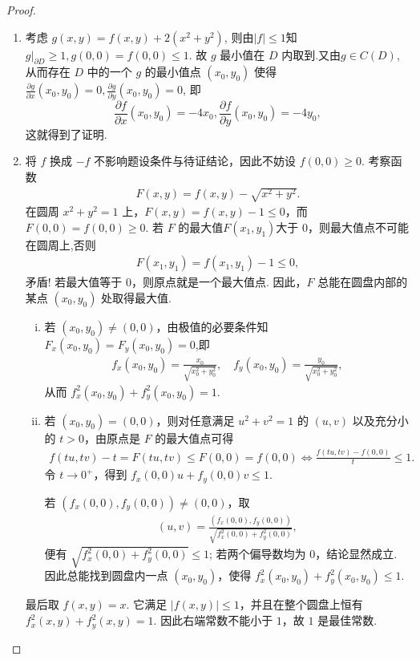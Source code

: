 \documentclass[../../main.tex]{subfiles}%
\begin{document}
\begin{proof}
\begin{enumerate}[(1)]
\item 考虑 \( g(x, y) = f(x, y) + 2(x^2 + y^2) \), 则由$|f|\leqslant 1$知\( g|_{\partial D} \geqslant 1, g(0, 0)=f(0,0) \leqslant 1 \). 故 \( g \) 最小值在 \( D \) 内取到.又由$g\in C(D)$,从而存在 \( D \) 中的一个 \( g \) 的最小值点 \( (x_0, y_0) \) 使得 \( \frac{\partial g}{\partial x}(x_0, y_0) = 0, \frac{\partial g}{\partial y}(x_0, y_0) = 0 \), 即
\[
\frac{\partial f}{\partial x}(x_0, y_0) = -4x_0, \frac{\partial f}{\partial y}(x_0, y_0) = -4y_0,
\]
这就得到了证明.

\item 将 \(f\) 换成 \(-f\) 不影响题设条件与待证结论，因此不妨设 \(f(0,0) \geqslant 0\).
考察函数
\begin{align*}
F(x,y) = f(x,y) - \sqrt{x^2+y^2}.
\end{align*}
在圆周 \(x^2+y^2=1\) 上，\(F(x,y) = f(x,y) - 1 \leqslant 0\)，而 \(F(0,0) = f(0,0) \geqslant 0\). 若 \(F\) 的最大值$F(x_1,y_1)$大于 \(0\)，则最大值点不可能在圆周上,否则
\begin{align*}
F(x_1,y_1)=f(x_1,y_1)-1\leqslant 0,
\end{align*}
矛盾!
若最大值等于 \(0\)，则原点就是一个最大值点. 因此，\(F\) 总能在圆盘内部的某点 \((x_0,y_0)\) 处取得最大值.
\begin{enumerate}[(i)]
\item 若 \((x_0,y_0) \neq (0,0)\)，由极值的必要条件知$F_x(x_0,y_0)=F_y(x_0,y_0)=0$,即
\begin{align*}
f_x(x_0,y_0) = \frac{x_0}{\sqrt{x_0^2+y_0^2}}, \quad f_y(x_0,y_0) = \frac{y_0}{\sqrt{x_0^2+y_0^2}},
\end{align*}
从而 \(f_x^2(x_0,y_0) + f_y^2(x_0,y_0) = 1\).

\item 若 \((x_0,y_0) = (0,0)\)，则对任意满足 \(u^2+v^2=1\) 的 \((u,v)\) 以及充分小的 \(t>0\)，由原点是 \(F\) 的最大值点可得
\begin{align*}
f(tu,tv)-t=F\left( tu,tv \right) \leqslant F\left( 0,0 \right) =f(0,0)\Longleftrightarrow \frac{f(tu,tv)-f(0,0)}{t}\leqslant 1.
\end{align*}
令 \(t \to 0^+\)，得到 \(f_x(0,0)u + f_y(0,0)v \leqslant 1\).

若 \((f_x(0,0), f_y(0,0)) \neq (0,0)\)，取
\begin{align*}
(u,v) = \frac{(f_x(0,0), f_y(0,0))}{\sqrt{f_x^2(0,0)+f_y^2(0,0)}},
\end{align*}
便有 \(\sqrt{f_x^2(0,0)+f_y^2(0,0)} \leqslant 1\); 若两个偏导数均为 \(0\)，结论显然成立. 因此总能找到圆盘内一点 \((x_0,y_0)\)，使得 \(f_x^2(x_0,y_0) + f_y^2(x_0,y_0) \leqslant 1\).
\end{enumerate}
最后取 \(f(x,y)=x\). 它满足 \(|f(x,y)| \leqslant 1\)，并且在整个圆盘上恒有 \(f_x^2(x,y) + f_y^2(x,y) = 1\). 因此右端常数不能小于 \(1\)，故 \(1\) 是最佳常数.
\end{enumerate}
\end{proof}
\end{document}
